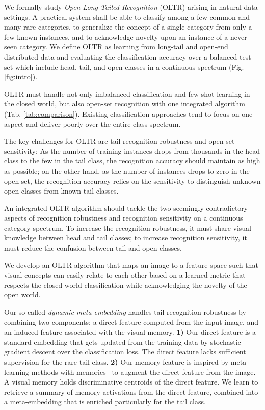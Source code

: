 \documentclass[10pt,twocolumn,letterpaper]{article}
\begin{document}
We formally study {\it Open Long-Tailed Recognition} (OLTR) arising in natural data settings.  A practical system shall be able to classify among a few common and many rare categories, to generalize the concept of a single category from only a few known instances, and to acknowledge novelty upon an instance of a never seen category.  We define OLTR as learning from long-tail and open-end distributed data and evaluating the classification accuracy over a balanced test set which include head, tail, and open classes in a continuous spectrum (Fig. \ref{fig:intro}). 

OLTR must handle not only imbalanced classification and few-shot learning in the closed world, but also open-set recognition with one integrated algorithm (Tab. \ref{tab:comparison}).
Existing classification approaches tend to focus on one aspect and deliver poorly over the entire class spectrum.

The key challenges for OLTR are tail recognition robustness and open-set sensitivity:
 As the number of training instances drops from thousands in the head class to the few in the tail class, the recognition accuracy should maintain as high as possible; on the other hand, as the number of instances drops to zero in the open set, the recognition accuracy relies on the sensitivity to distinguish unknown open classes from known tail classes.  
 
 An integrated OLTR algorithm should tackle the two seemingly contradictory aspects of recognition robustness and recognition sensitivity on a continuous category spectrum.  To increase the recognition robustness, it must share visual knowledge between head and tail classes;  to increase recognition sensitivity, it must reduce the confusion between tail and open classes.




We develop an OLTR algorithm that maps an image to a feature space such that visual concepts can easily relate to each other based on a learned metric that respects the closed-world classification while acknowledging the novelty of the open world.  

Our so-called {\it dynamic meta-embedding}
handles tail recognition robustness by combining two components:  a direct feature computed from the input image, and an induced feature associated with the visual memory. 
{\bf 1)}
Our direct feature is a standard  embedding that gets updated from the training data by stochastic gradient descent over the classification loss.  The direct feature lacks sufficient supervision for the rare tail class.  
{\bf 2)}
Our memory feature is inspired by meta learning methods with memories~\cite{vinyals2016matching, duan2016rl, ba2016using} to augment the direct feature from the image.
A visual memory holds discriminative centroids of the direct feature. We learn to retrieve a summary of memory activations from the direct feature, combined into a meta-embedding that is enriched particularly for the tail class.
\end{document}
